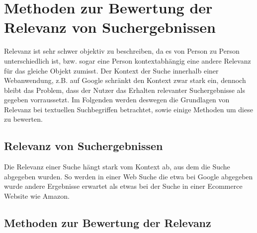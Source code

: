 \chapter{Methoden zur Bewertung der Relevanz von Suchergebnissen}
\label{ch:grundlagen}

Relevanz ist sehr schwer objektiv zu beschreiben, da es von Person zu Person unterschiedlich ist, bzw. sogar eine Person kontextabhängig eine andere Relevanz für das gleiche Objekt zumisst. Der Kontext der Suche innerhalb einer Webanwendung, z.B. auf Google schränkt den Kontext zwar stark ein, dennoch bleibt das Problem, dass der Nutzer das Erhalten relevanter Suchergebnisse als gegeben vorraussetzt. Im Folgenden werden deswegen die Grundlagen von Relevanz bei textuellen Suchbegriffen betrachtet, sowie einige Methoden um diese zu bewerten.

\section{Relevanz von Suchergebnissen}



Die Relevanz einer Suche hängt stark vom Kontext ab, aus dem die Suche abgegeben wurden. So werden in einer Web Suche die etwa bei Google abgegeben wurde andere Ergebnisse erwartet als etwas bei der Suche in einer Ecommerce Website wie Amazon.


\section{Methoden zur Bewertung der Relevanz}
